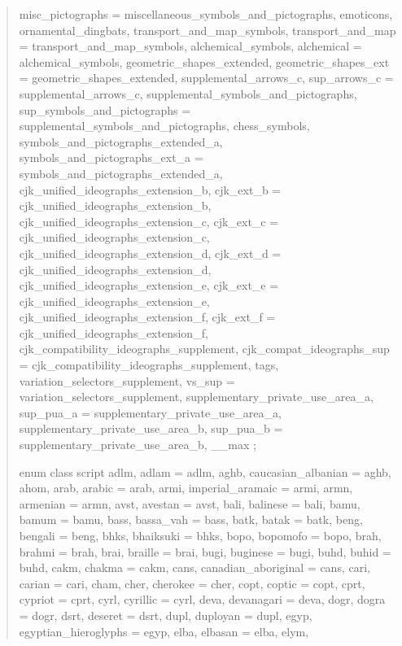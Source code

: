 \documentclass{wg21}
\begin{document}
\begin{quote}
\begin{itemdecl}
{    misc_pictographs = miscellaneous_symbols_and_pictographs,
    emoticons,
    ornamental_dingbats,
    transport_and_map_symbols,
    transport_and_map = transport_and_map_symbols,
    alchemical_symbols,
    alchemical = alchemical_symbols,
    geometric_shapes_extended,
    geometric_shapes_ext = geometric_shapes_extended,
    supplemental_arrows_c,
    sup_arrows_c = supplemental_arrows_c,
    supplemental_symbols_and_pictographs,
    sup_symbols_and_pictographs = supplemental_symbols_and_pictographs,
    chess_symbols,
    symbols_and_pictographs_extended_a,
    symbols_and_pictographs_ext_a = symbols_and_pictographs_extended_a,
    cjk_unified_ideographs_extension_b,
    cjk_ext_b = cjk_unified_ideographs_extension_b,
    cjk_unified_ideographs_extension_c,
    cjk_ext_c = cjk_unified_ideographs_extension_c,
    cjk_unified_ideographs_extension_d,
    cjk_ext_d = cjk_unified_ideographs_extension_d,
    cjk_unified_ideographs_extension_e,
    cjk_ext_e = cjk_unified_ideographs_extension_e,
    cjk_unified_ideographs_extension_f,
    cjk_ext_f = cjk_unified_ideographs_extension_f,
    cjk_compatibility_ideographs_supplement,
    cjk_compat_ideographs_sup = cjk_compatibility_ideographs_supplement,
    tags,
    variation_selectors_supplement,
    vs_sup = variation_selectors_supplement,
    supplementary_private_use_area_a,
    sup_pua_a = supplementary_private_use_area_a,
    supplementary_private_use_area_b,
    sup_pua_b = supplementary_private_use_area_b,
    __max
};
\end{itemdecl}
\begin{itemdecl}
enum class script {
    adlm,
    adlam = adlm,
    aghb,
    caucasian_albanian = aghb,
    ahom,
    arab,
    arabic = arab,
    armi,
    imperial_aramaic = armi,
    armn,
    armenian = armn,
    avst,
    avestan = avst,
    bali,
    balinese = bali,
    bamu,
    bamum = bamu,
    bass,
    bassa_vah = bass,
    batk,
    batak = batk,
    beng,
    bengali = beng,
    bhks,
    bhaiksuki = bhks,
    bopo,
    bopomofo = bopo,
    brah,
    brahmi = brah,
    brai,
    braille = brai,
    bugi,
    buginese = bugi,
    buhd,
    buhid = buhd,
    cakm,
    chakma = cakm,
    cans,
    canadian_aboriginal = cans,
    cari,
    carian = cari,
    cham,
    cher,
    cherokee = cher,
    copt,
    coptic = copt,
    cprt,
    cypriot = cprt,
    cyrl,
    cyrillic = cyrl,
    deva,
    devanagari = deva,
    dogr,
    dogra = dogr,
    dsrt,
    deseret = dsrt,
    dupl,
    duployan = dupl,
    egyp,
    egyptian_hieroglyphs = egyp,
    elba,
    elbasan = elba,
    elym,
}
\end{itemdecl}
\end{quote}
\end{document}
